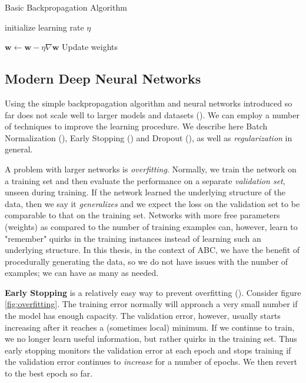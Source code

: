 \documentclass{article}
\newcommand{\citep}[2][]{(\cite[#1]{#2})}
\begin{document}
\begin{algorithm}
    \caption{Basic Backpropagation Algorithm}
    \begin{algorithmic}[1]
        \State initialize learning rate $\eta$

            \State $\mathbf{w} \gets \mathbf{w} - \eta \nabla \mathbf{w}$
            \Comment Update weights
        \EndWhile
    \end{algorithmic}
\end{algorithm}

\subsection{Modern Deep Neural Networks}
\label{subsec:nn_modern}

Using the simple backpropagation algorithm and neural networks introduced so far does not scale well to larger models and datasets \citep[Chapter 7]{goodfellow_deep_2016}. We can employ a number of techniques to improve the learning procedure. We describe here Batch Normalization \citep{ioffe_batch_2015}, Early Stopping \citep{prechelt_early_2012} and Dropout \citep{srivastava_dropout:_2014}, as well as \textit{regularization} in general.
\vskip 0.1in

A problem with larger networks is \textit{overfitting}. Normally, we train the network on a training set and then evaluate the performance on a separate \textit{validation set}, unseen during training. If the network learned the underlying structure of the data, then we say it \textit{generalizes} and we expect the loss on the validation set to be comparable to that on the training set. Networks with more free parameters (weights) as compared to the number of training examples can, however, learn to "remember" quirks in the training instances instead of learning such an underlying structure. In this thesis, in the context of ABC, we have the benefit of procedurally generating the data, so we do not have issues with the number of examples; we can have as many as needed.
\vskip 0.1in

\textbf{Early Stopping} is a relatively easy way to prevent overfitting \citep{prechelt_early_2012}. Consider figure \ref{fig:overfitting}. The training error normally will approach a very small number if the model has enough capacity. The validation error, however, usually starts increasing after it reaches a (sometimes local) minimum. If we continue to train, we no longer learn useful information, but rather quirks in the training set. Thus early stopping monitors the validation error at each epoch and stops training if the validation error continues to \textit{increase} for a number of epochs. We then revert to the best epoch so far.
\vskip 0.1in
\end{document}
